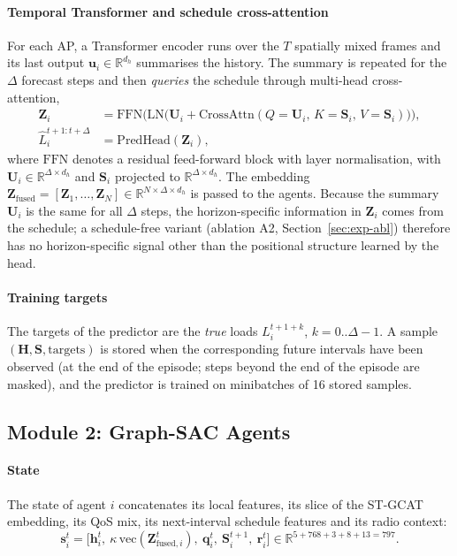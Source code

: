 \paragraph{Temporal Transformer and schedule cross-attention} For each AP, a Transformer encoder runs over the $T$ spatially mixed frames and its last output $\mathbf{u}_i\in\mathbb{R}^{d_h}$ summarises the history. The summary is repeated for the $\Delta$ forecast steps and then \emph{queries} the schedule through multi-head cross-attention,
\begin{align}
  \mathbf{Z}_i&=\mathrm{FFN}\Big(\mathrm{LN}\big(\mathbf{U}_i+\mathrm{CrossAttn}(Q=\mathbf{U}_i,\,K=\mathbf{S}_i,\,V=\mathbf{S}_i)\big)\Big),\nonumber\\
  \hat L_i^{t+1:t+\Delta}&=\mathrm{PredHead}(\mathbf{Z}_i),
  \label{eq:pred}
\end{align}
where $\mathrm{FFN}$ denotes a residual feed-forward block with layer normalisation,
with $\mathbf{U}_i\in\mathbb{R}^{\Delta\times d_h}$ and $\mathbf{S}_i$ projected to $\mathbb{R}^{\Delta\times d_h}$. The embedding $\mathbf{Z}_{\mathrm{fused}}=[\mathbf{Z}_1,\dots,\mathbf{Z}_N]\in\mathbb{R}^{N\times\Delta\times d_h}$ is passed to the agents. Because the summary $\mathbf{U}_i$ is the same for all $\Delta$ steps, the horizon-specific information in $\mathbf{Z}_i$ comes from the schedule; a schedule-free variant (ablation A2, Section~\ref{sec:exp-abl}) therefore has no horizon-specific signal other than the positional structure learned by the head.

\paragraph{Training targets} The targets of the predictor are the \emph{true} loads $L_i^{t+1+k}$, $k=0..\Delta-1$. A sample $(\mathbf{H},\mathbf{S},\text{targets})$ is stored when the corresponding future intervals have been observed (at the end of the episode; steps beyond the end of the episode are masked), and the predictor is trained on minibatches of 16 stored samples.

\subsection{Module 2: Graph-SAC Agents}
\label{sec:sac}

\paragraph{State} The state of agent $i$ concatenates its local features, its slice of the ST-GCAT embedding, its QoS mix, its next-interval schedule features and its radio context:
\begin{equation}
  \mathbf{s}_i^t=\big[\mathbf{h}_i^t,\ \kappa\,\mathrm{vec}(\mathbf{Z}_{\mathrm{fused},i}^t),\ \mathbf{q}_i^t,\ \mathbf{S}_{i}^{t+1},\ \mathbf{r}_i^t\big]\in\mathbb{R}^{5+768+3+8+13=797}.
  \label{eq:state}
\end{equation}

